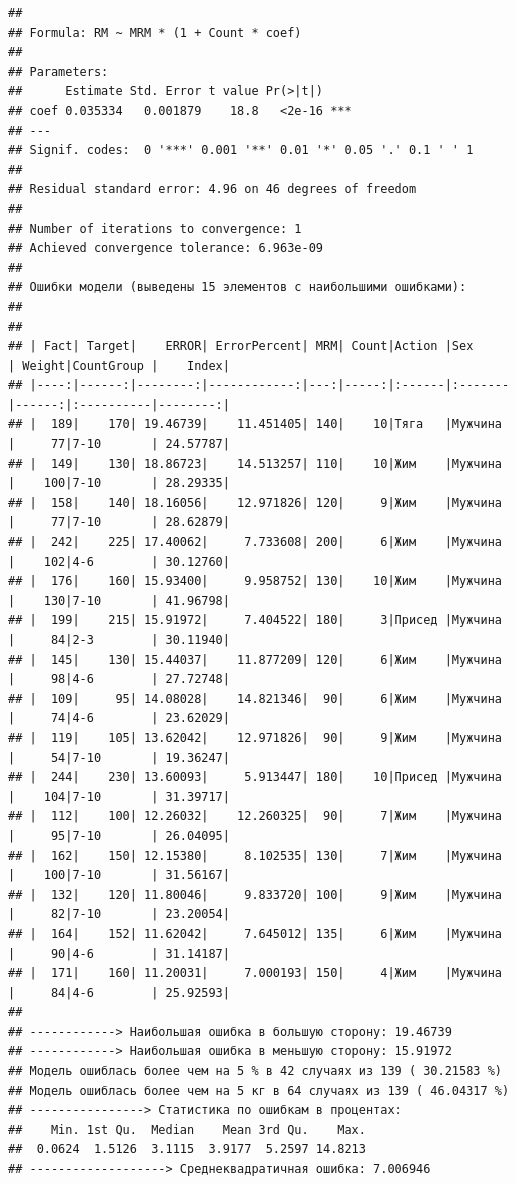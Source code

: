 \documentclass[
]{article}
\begin{document}
\begin{verbatim}
## 
## Formula: RM ~ MRM * (1 + Count * coef)
## 
## Parameters:
##      Estimate Std. Error t value Pr(>|t|)    
## coef 0.035334   0.001879    18.8   <2e-16 ***
## ---
## Signif. codes:  0 '***' 0.001 '**' 0.01 '*' 0.05 '.' 0.1 ' ' 1
## 
## Residual standard error: 4.96 on 46 degrees of freedom
## 
## Number of iterations to convergence: 1 
## Achieved convergence tolerance: 6.963e-09
## 
## Ошибки модели (выведены 15 элементов с наибольшими ошибками): 
## 
## 
## | Fact| Target|    ERROR| ErrorPercent| MRM| Count|Action |Sex     | Weight|CountGroup |    Index|
## |----:|------:|--------:|------------:|---:|-----:|:------|:-------|------:|:----------|--------:|
## |  189|    170| 19.46739|    11.451405| 140|    10|Тяга   |Мужчина |     77|7-10       | 24.57787|
## |  149|    130| 18.86723|    14.513257| 110|    10|Жим    |Мужчина |    100|7-10       | 28.29335|
## |  158|    140| 18.16056|    12.971826| 120|     9|Жим    |Мужчина |     77|7-10       | 28.62879|
## |  242|    225| 17.40062|     7.733608| 200|     6|Жим    |Мужчина |    102|4-6        | 30.12760|
## |  176|    160| 15.93400|     9.958752| 130|    10|Жим    |Мужчина |    130|7-10       | 41.96798|
## |  199|    215| 15.91972|     7.404522| 180|     3|Присед |Мужчина |     84|2-3        | 30.11940|
## |  145|    130| 15.44037|    11.877209| 120|     6|Жим    |Мужчина |     98|4-6        | 27.72748|
## |  109|     95| 14.08028|    14.821346|  90|     6|Жим    |Мужчина |     74|4-6        | 23.62029|
## |  119|    105| 13.62042|    12.971826|  90|     9|Жим    |Мужчина |     54|7-10       | 19.36247|
## |  244|    230| 13.60093|     5.913447| 180|    10|Присед |Мужчина |    104|7-10       | 31.39717|
## |  112|    100| 12.26032|    12.260325|  90|     7|Жим    |Мужчина |     95|7-10       | 26.04095|
## |  162|    150| 12.15380|     8.102535| 130|     7|Жим    |Мужчина |    100|7-10       | 31.56167|
## |  132|    120| 11.80046|     9.833720| 100|     9|Жим    |Мужчина |     82|7-10       | 23.20054|
## |  164|    152| 11.62042|     7.645012| 135|     6|Жим    |Мужчина |     90|4-6        | 31.14187|
## |  171|    160| 11.20031|     7.000193| 150|     4|Жим    |Мужчина |     84|4-6        | 25.92593|
## 
## ------------> Наибольшая ошибка в большую сторону: 19.46739 
## ------------> Наибольшая ошибка в меньшую сторону: 15.91972 
## Модель ошиблась более чем на 5 % в 42 случаях из 139 ( 30.21583 %)
## Модель ошиблась более чем на 5 кг в 64 случаях из 139 ( 46.04317 %)
## ----------------> Статистика по ошибкам в процентах:
##    Min. 1st Qu.  Median    Mean 3rd Qu.    Max. 
##  0.0624  1.5126  3.1115  3.9177  5.2597 14.8213 
## -------------------> Среднеквадратичная ошибка: 7.006946
\end{verbatim}
\end{document}
